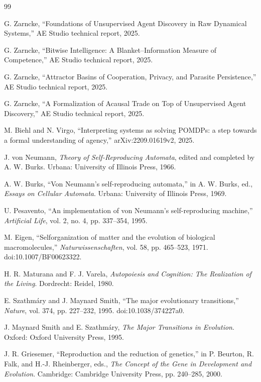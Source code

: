 \documentclass[11pt]{article}
\begin{document}
\begin{thebibliography}{99}

G. Zarncke, ``Foundations of Unsupervised Agent Discovery in Raw Dynamical Systems,'' AE Studio technical report, 2025.

G. Zarncke, ``Bitwise Intelligence: A Blanket--Information Measure of Competence,'' AE Studio technical report, 2025.

G. Zarncke, ``Attractor Basins of Cooperation, Privacy, and Parasite Persistence,'' AE Studio technical report, 2025.

G. Zarncke, ``A Formalization of Acausal Trade on Top of Unsupervised Agent Discovery,'' AE Studio technical report, 2025.

M. Biehl and N. Virgo, ``Interpreting systems as solving POMDPs: a step towards a formal understanding of agency,'' arXiv:2209.01619v2, 2025.

J. von Neumann, \emph{Theory of Self-Reproducing Automata}, edited and completed by A. W. Burks. Urbana: University of Illinois Press, 1966.

A. W. Burks, ``Von Neumann's self-reproducing automata,'' in A. W. Burks, ed., \emph{Essays on Cellular Automata}. Urbana: University of Illinois Press, 1969.

U. Pesavento, ``An implementation of von Neumann's self-reproducing machine,'' \emph{Artificial Life}, vol. 2, no. 4, pp. 337--354, 1995.

M. Eigen, ``Selforganization of matter and the evolution of biological macromolecules,'' \emph{Naturwissenschaften}, vol. 58, pp. 465--523, 1971. doi:10.1007/BF00623322.

H. R. Maturana and F. J. Varela, \emph{Autopoiesis and Cognition: The Realization of the Living}. Dordrecht: Reidel, 1980.

E. Szathm\'ary and J. Maynard Smith, ``The major evolutionary transitions,'' \emph{Nature}, vol. 374, pp. 227--232, 1995. doi:10.1038/374227a0.

J. Maynard Smith and E. Szathm\'ary, \emph{The Major Transitions in Evolution}. Oxford: Oxford University Press, 1995.

J. R. Griesemer, ``Reproduction and the reduction of genetics,'' in P. Beurton, R. Falk, and H.-J. Rheinberger, eds., \emph{The Concept of the Gene in Development and Evolution}. Cambridge: Cambridge University Press, pp. 240--285, 2000.


\end{thebibliography}
\end{document}
